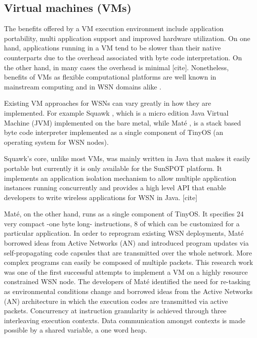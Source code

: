 \subsection{Virtual machines (VMs)}
The benefits offered by a VM execution environment include application portability, multi application support and improved hardware utilization. On one hand, applications running in a VM tend to be slower than their native counterparts due to the overhead associated with byte code interpretation. On the other hand, in many cases the overhead is minimal [cite]. Nonetheless, benefits of VMs as flexible computational platforms are well known in mainstream computing\cite{Montero2011750} and in WSN domains alike \cite{Brouwers:2009:DFV:1644038.1644056}.  

Existing VM approaches for WSNs can vary greatly in how they are implemented. For example Squawk \cite{simon2005squawk}, which is a micro edition Java Virtual Machine (JVM) implemented on the bare metal, while Maté \cite{Levis:2002:MTV:635506.605407}, is a stack based byte code interpreter implemented as a single component of TinyOS \cite{1630599} (an operating system for WSN nodes).

Squawk's core, unlike most VMs, was mainly written in Java that makes it easily portable but currently it is only available for the SunSPOT platform. It implements an application isolation mechanism to allow multiple application instances running concurrently and provides a high level API that enable developers to write wireless applications for WSN in Java. [cite] 
 
Maté, on the other hand, runs as a single component of TinyOS.  It specifies 24 very compact -one byte long- instructions, 8 of which can be customized for a particular application. In order to reprogram existing WSN deployments, Maté borrowed ideas from Active Networks (AN) and introduced program updates via self-propagating code capsules that are transmitted over the whole network. More complex programs can easily be composed of multiple packets. \cite{Levis:2002:MTV:635506.605407}
This research work was one of the first successful attempts to implement a VM on a highly resource constrained WSN node. The developers of Maté identified the need for re-tasking as environmental conditions change and borrowed ideas from the Active Networks (AN) architecture in which the execution codes are transmitted via active packets. Concurrency at instruction granularity is achieved through three interleaving execution contexts.  Data communication amongst contexts is made possible by a shared variable, a one word heap. 


